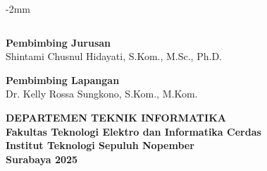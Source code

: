 \begin{flushleft}
\begin{adjustwidth}{-2mm}{}
\begin{tabular}{lcp{0.7\linewidth}}
  	\end{tabular}
  \end{adjustwidth}
  \vspace{2ex}
  \noindent\textbf{Pembimbing Jurusan} \\
  \normalsize{Shintami Chusnul Hidayati, S.Kom., M.Sc., Ph.D.}
  \vspace{2ex}
  
  \noindent\textbf{Pembimbing Lapangan} \\
  \normalsize{Dr. Kelly Rossa Sungkono, S.Kom., M.Kom.}
  \vspace{3ex}
  
  \noindent\textbf{DEPARTEMEN TEKNIK INFORMATIKA} \\
  \textbf{Fakultas Teknologi Elektro dan Informatika Cerdas} \\
  \textbf{Institut Teknologi Sepuluh Nopember} \\
  \textbf{Surabaya 2025}

\end{flushleft}

\restoregeometry
